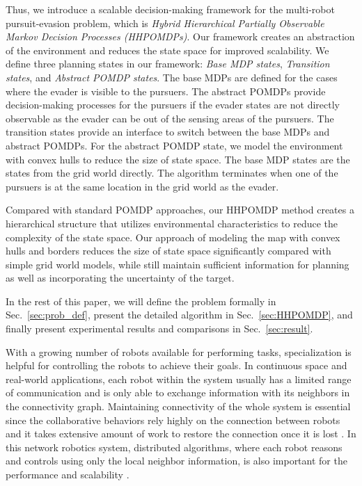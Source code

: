 \documentclass[../main.tex]{subfiles}
\begin{document}
Thus, we introduce a scalable decision-making framework for the multi-robot pursuit-evasion problem, which is \textit{Hybrid Hierarchical Partially Observable Markov Decision Processes (HHPOMDPs)}. Our framework creates an abstraction of the environment and reduces the state space for improved scalability. We define three planning states in our framework: \textit{Base MDP states}, \textit{Transition states}, and \textit{Abstract POMDP states}. The base MDPs are defined for the cases where the evader is visible to the pursuers. The abstract POMDPs provide decision-making processes for the pursuers if the evader states are not directly observable as the evader can be out of the sensing areas of the pursuers. The transition states provide an interface to switch between the base MDPs and abstract POMDPs. For the abstract POMDP state, we model the environment with convex hulls to reduce the size of state space. The base MDP states are the states from the grid world directly. The algorithm terminates when one of the pursuers is at the same location in the grid world as the evader.

Compared with standard POMDP approaches, our HHPOMDP method creates a hierarchical structure that utilizes environmental characteristics to reduce the complexity of the state space. 
Our approach of modeling the map with convex hulls and borders reduces the size of state space significantly compared with simple grid world models, while still maintain sufficient information for planning as well as incorporating the uncertainty of the target.

In the rest of this paper, we will define the problem formally in Sec.~\ref{sec:prob_def}, present the detailed algorithm in Sec.~\ref{sec:HHPOMDP}, and finally present experimental results and comparisons in Sec.~\ref{sec:result}. 

With a growing number of robots available for performing tasks, specialization is helpful for controlling the robots to achieve their goals. In continuous space and real-world applications, each robot within the system usually has a limited range of communication \cite{moreau2005stability} and is only able to exchange information with its neighbors in the connectivity graph. Maintaining connectivity of the whole system is essential \cite{hsieh2008maintaining} since the collaborative behaviors rely highly on the connection between robots \cite{zavlanos2008distributed} and it takes extensive amount of work to restore the connection once it is lost \cite{mi2011hero}. In this network robotics system, distributed algorithms, where each robot reasons and controls using only the local neighbor information, is also important for the performance and scalability \cite{zavlanos2008distributed}.
\end{document}
